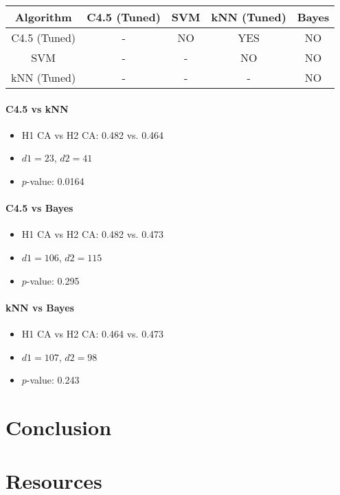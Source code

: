 \documentclass[]{article}
\begin{document}
\begin{tabular}{|c|c|c|c|c|}
\hline
Algorithm & C4.5 (Tuned) & SVM & kNN (Tuned) & Bayes \\
\hline
C4.5 (Tuned) & - & NO & YES & NO \\
SVM & - & - & NO & NO \\
kNN (Tuned) & - & - & - & NO \\
\hline
\end{tabular}

\paragraph{C4.5 vs kNN}
\begin{itemize}
	\item H1 CA vs H2 CA: 0.482 vs. 0.464
	\item $d1 = 23$, $d2 = 41$
	\item $p$-value: 0.0164
\end{itemize}

\paragraph{C4.5 vs Bayes}
\begin{itemize}
	\item H1 CA vs H2 CA: 0.482 vs. 0.473
	\item $d1 = 106$, $d2 = 115$
	\item $p$-value: 0.295
\end{itemize}

\paragraph{kNN vs Bayes}
\begin{itemize}
	\item H1 CA vs H2 CA: 0.464 vs. 0.473
	\item $d1 = 107$, $d2 = 98$
	\item $p$-value: 0.243
\end{itemize}

\section{Conclusion}

\section{Resources}
\end{document}
